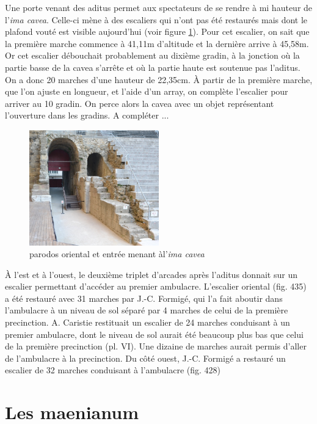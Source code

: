 Une porte venant des aditus permet aux spectateurs de se rendre à mi hauteur de l'\textit{ima cavea}. Celle-ci mène à des escaliers qui n'ont pas été restaurés mais dont le plafond vouté est visible aujourd'hui (voir figure \ref{parodos}). Pour cet escalier, on sait que la première marche commence à 41,11m d'altitude et la dernière arrive à 45,58m. Or cet escalier débouchait probablement au dixième gradin, à la jonction où la partie basse de la cavea s'arrête et où la partie haute est soutenue pas l'aditus. On a donc 20 marches d'une hauteur de 22,35cm. \`{A} partir de la première marche, que l'on ajuste en longueur, et l'aide d'un \gls{array}, on complète l'escalier pour arriver au 10 gradin. On perce alors la cavea avec un objet représentant l'ouverture dans les gradins. A compléter ...


\begin{figure}[!h]
	\centering
	\includegraphics[width=0.5\textwidth]{images/parodos}
	\caption[\Gls{parodos} oriental et entrée menant àl'\textit{ima cavea}]{\Gls{parodos} oriental et entrée menant àl'\textit{ima cavea} \cite[fig. 418]{orangeTxt}} 
	\label{parodos} 
\end{figure}

\`{A} l'est et à l'ouest, le deuxième triplet d'arcades après l'\gls{aditus} donnait sur un escalier permettant d'accéder au premier \gls{ambulacre}. L'escalier oriental (fig. 435) a été restauré avec 31 marches par J.-C. Formigé, qui l'a fait aboutir dans l'ambulacre à un niveau de sol séparé par 4 marches de celui de la première precinction. A. Caristie restituait un escalier de 24 marches conduisant à un premier ambulacre, dont le niveau de sol aurait été beaucoup plus bas que celui de la première precinction (pl. VI). Une dizaine de
marches aurait permis d'aller de l'ambulacre à la precinction.
Du côté ouest, J.-C. Formigé a restauré un escalier de 32 marches conduisant à
l'ambulacre (fig. 428)


		\section{Les maenianum} 

